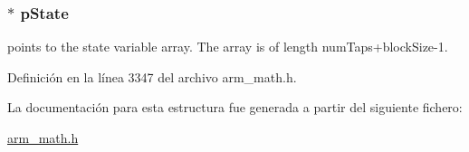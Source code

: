\subsubsection[{\texorpdfstring{p\+State}{pState}}]{$\ast$ p\+State}\hypertarget{structarm__fir__decimate__instance__f32_a335c87e6fdc4b96601d95a5de8b9c463}{}\label{structarm__fir__decimate__instance__f32_a335c87e6fdc4b96601d95a5de8b9c463}
points to the state variable array. The array is of length num\+Taps+block\+Size-\/1. 

Definición en la línea 3347 del archivo arm\+\_\+math.\+h.



La documentación para esta estructura fue generada a partir del siguiente fichero\+:\begin{DoxyCompactItemize}
\item 
\hyperlink{arm__math_8h}{arm\+\_\+math.\+h}\end{DoxyCompactItemize}
